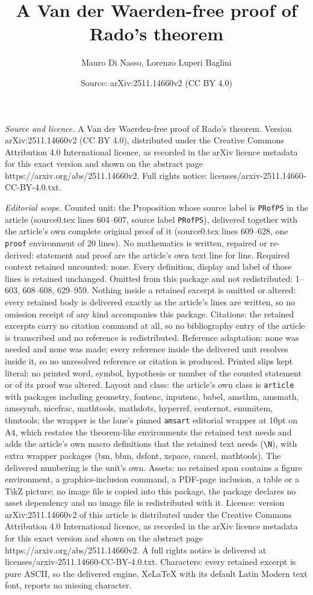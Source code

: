 \documentclass[10pt,a4paper]{amsart}
\title[A Van der Waerden-free proof of Rado's theorem]{A Van der Waerden-free proof of Rado's theorem}
\author{Mauro Di Nasso, Lorenzo Luperi Baglini}
\date{Source: arXiv:2511.14660v2 (CC BY 4.0)}
\begin{document}
\maketitle

\noindent\emph{Source and licence.} A Van der Waerden-free proof of Rado's theorem. Version arXiv:2511.14660v2 (CC BY 4.0), distributed under the Creative Commons Attribution 4.0 International licence, as recorded in the arXiv licence metadata for this exact version and shown on the abstract page https://arxiv.org/abs/2511.14660v2. Full rights notice: licenses/arxiv-2511.14660-CC-BY-4.0.txt.\par\smallskip

\noindent\textit{Editorial scope.} Counted unit: the Proposition whose source label is \texttt{PRofPS} in the article (source0.tex lines 604--607, source label \texttt{PRofPS}), delivered together with the article's own complete original proof of it (source0.tex lines 609--628, one \texttt{proof} environment of 20 lines). No mathematics is written, repaired or re-derived: statement and proof are the article's own text line for line. Required context retained uncounted: none. Every definition, display and label of those lines is retained unchanged. Omitted from this package and not redistributed: 1--603, 608--608, 629--959. Nothing inside a retained excerpt is omitted or altered: every retained body is delivered exactly as the article's lines are written, so no omission receipt of any kind accompanies this package. Citations: the retained excerpts carry no citation command at all, so no bibliography entry of the article is transcribed and no reference is redistributed. Reference adaptation: none was needed and none was made; every reference inside the delivered unit resolves inside it, so no unresolved reference or citation is produced. Printed slips kept literal: no printed word, symbol, hypothesis or number of the counted statement or of its proof was altered. Layout and class: the article's own class is \texttt{article} with packages including geometry, fontenc, inputenc, babel, amsthm, amsmath, amssymb, nicefrac, mathtools, mathdots, hyperref, centernot, enumitem, thmtools; the wrapper is the lane's pinned \texttt{amsart} editorial wrapper at 10pt on A4, which restates the theorem-like environments the retained text needs and adds the article's own macro definitions that the retained text needs (\texttt{\textbackslash N}), with extra wrapper packages (bm, bbm, dsfont, xspace, cancel, mathtools). The delivered numbering is the unit's own. Assets: no retained span contains a figure environment, a graphics-inclusion command, a PDF-page inclusion, a table or a TikZ picture; no image file is copied into this package, the package declares no asset dependency and no image file is redistributed with it. Licence: version arXiv:2511.14660v2 of this article is distributed under the Creative Commons Attribution 4.0 International licence, as recorded in the arXiv licence metadata for this exact version and shown on the abstract page https://arxiv.org/abs/2511.14660v2. A full rights notice is delivered at licenses/arxiv-2511.14660-CC-BY-4.0.txt. Characters: every retained excerpt is pure ASCII, so the delivered engine, XeLaTeX with its default Latin Modern text font, reports no missing character.
\end{document}
